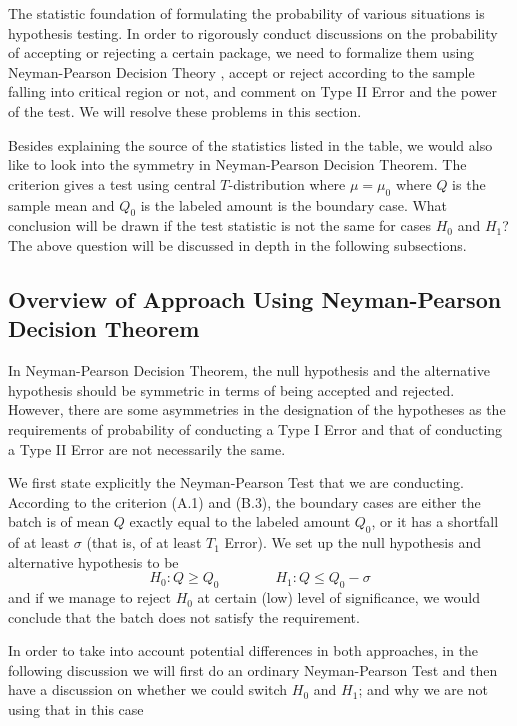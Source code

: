 \documentclass[12pt]{article}
\begin{document}
The statistic foundation of formulating the probability of various situations is hypothesis testing. In order to rigorously conduct discussions on the probability of accepting or rejecting a certain package, we need to formalize them using Neyman-Pearson Decision Theory \cite{Ho2023}, accept or reject according to the sample falling into critical region or not, and comment on Type II Error and the power of the test. We will resolve these problems in this section.

Besides explaining the source of the statistics listed in the table, we would also like to look into the symmetry in Neyman-Pearson Decision Theorem. The criterion gives a test using central $T$-distribution where $\mu=\mu_0$ where $Q$ is the sample mean and $Q_0$ is the labeled amount is the boundary case. What conclusion will be drawn if the test statistic is not the same for cases $H_0$ and $H_1$? The above question will be discussed in depth in the following subsections.

\subsection{Overview of Approach Using Neyman-Pearson Decision Theorem}

In Neyman-Pearson Decision Theorem, the null hypothesis and the alternative hypothesis should be symmetric in terms of being accepted and rejected. However, there are some asymmetries in the designation of the hypotheses as the requirements of probability of conducting a Type I Error and that of conducting a Type II Error are not necessarily the same. 

We first state explicitly the Neyman-Pearson Test that we are conducting. According to the criterion (A.1) and (B.3), the boundary cases are either the batch is of mean $Q$ exactly equal to the labeled amount $Q_0$, or it has a shortfall of at least $\sigma$ (that is, of at least $T_1$ Error). We set up the null hypothesis and alternative hypothesis to be
\begin{equation}\label{hypothesis1}    
    H_0 : Q\geq Q_0 \quad\quad\quad\quad H_1 : Q\leq Q_0 - \sigma
\end{equation}
and if we manage to reject $H_0$ at certain (low) level of significance, we would conclude that the batch does not satisfy the requirement. 

In order to take into account potential differences in both approaches, in the following discussion we will first do an ordinary Neyman-Pearson Test and then have a discussion on whether we could switch $H_0$ and $H_1$; and why we are not using that in this case
\end{document}
